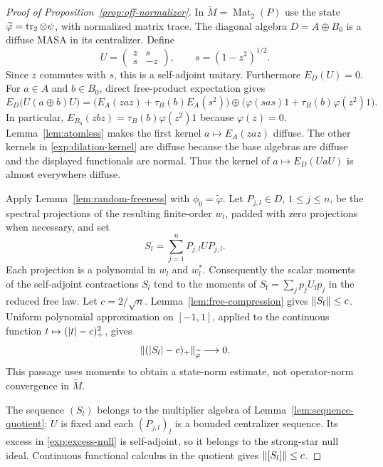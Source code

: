 \begin{proof}[Proof of Proposition~\ref{prop:off-normalizer}]
In $\widetilde M=\operatorname{Mat}_2(P)$ use the state
$\widetilde\varphi=\operatorname{tr}_2\otimes\psi$, with normalized matrix trace.
The diagonal algebra $D=A\oplus B_0$ is a diffuse MASA in its
centralizer. Define
\begin{equation}\label{exp:unitary-dilation}
 U=\begin{pmatrix}z&s\\s&-z\end{pmatrix},\qquad
 s=(1-z^2)^{1/2}.
\end{equation}
Since $z$ commutes with $s$, this is a self-adjoint unitary.
Furthermore $E_D(U)=0$. For $a\in A$ and $b\in B_0$,
direct free-product expectation gives
\begin{equation}\label{exp:dilation-kernel}
 E_D\bigl(U(a\oplus b)U\bigr)
 =\bigl(E_A(zaz)+\tau_B(b)E_A(s^2)\bigr)
  \oplus
  \bigl(\varphi(sas)1+\tau_B(b)\varphi(z^2)1\bigr).
\end{equation}
In particular, $E_{B_0}(zbz)=\tau_B(b)\varphi(z^2)1$ because
$\varphi(z)=0$. Lemma~\ref{lem:atomless} makes the first kernel
$a\mapsto E_A(zaz)$ diffuse. The other kernels in
\eqref{exp:dilation-kernel} are diffuse because the base algebras
are diffuse and the displayed functionals are normal. Thus the
kernel of $a\mapsto E_D(UaU)$ is almost everywhere diffuse.

Apply Lemma~\ref{lem:random-freeness} with $\phi_0=
\widetilde\varphi$. Let $P_{j,l}\in D$, $1\leq j\leq n$, be the
spectral projections of the resulting finite-order $w_l$, padded
with zero projections when necessary, and set
\[
 S_l=\sum_{j=1}^n P_{j,l}UP_{j,l}.
\]
Each projection is a polynomial in $w_l$ and $w_l^*$.
Consequently the scalar moments of the self-adjoint contractions
$S_l$ tend to the moments of
$S_{\mathrm f}=\sum_jp_jU_{\mathrm f}p_j$ in the reduced free law.
Let $c=2/\sqrt n$. Lemma~\ref{lem:free-compression} gives
$\left\lVert S_{\mathrm f}\right\rVert\leq c$. Uniform polynomial approximation
on $[-1,1]$, applied to the continuous function
$t\mapsto(\left|t\right|-c)_+^2$, gives
\begin{equation}\label{exp:excess-null}
 \left\lVert(\left|S_l\right|-c)_+\right\rVert_{\widetilde\varphi}\longrightarrow0.
\end{equation}
This passage uses moments to obtain a state-norm estimate, not
operator-norm convergence in $\widetilde M$.

The sequence $(S_l)$ belongs to the multiplier algebra of
Lemma~\ref{lem:sequence-quotient}: $U$ is fixed and each
$(P_{j,l})_l$ is a bounded centralizer sequence. Its excess in
\eqref{exp:excess-null} is self-adjoint, so it belongs to the
strong-star null ideal. Continuous functional calculus in the
quotient gives $\left\lVert[S_l]\right\rVert\leq c$.


\end{proof}
